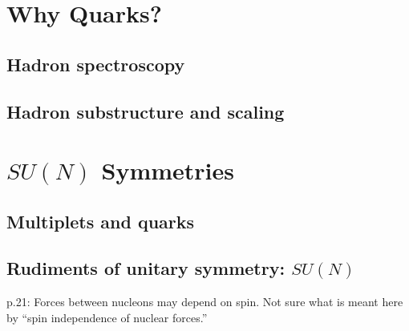\documentclass{book}
\begin{document}
\chapter{Why Quarks?}

\section{Hadron spectroscopy}
\section{Hadron substructure and scaling}

\chapter{$SU(N)$ Symmetries}

\section{Multiplets and quarks}
\section{Rudiments of unitary symmetry: $SU(N)$}

p.21: Forces between nucleons may depend on spin. Not sure what is meant here by ``spin independence of nuclear forces.''
\end{document}
